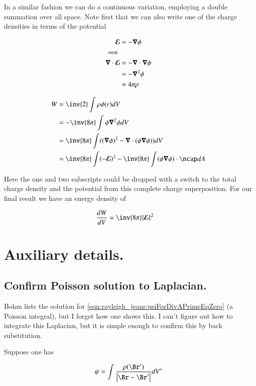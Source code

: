 In a similar fashion we can do a continuous variation, employing a double summation over all space.  Note first
that we can also write
one of the charge densities in terms of the potential 

\begin{align*}
\boldsymbol{\mathcal{E}} &= - \boldsymbol{\nabla} \phi \\
\implies \\
\boldsymbol{\nabla} \cdot \boldsymbol{\mathcal{E}} 
&= - \boldsymbol{\nabla} \cdot \boldsymbol{\nabla} \phi \\
&= - \boldsymbol{\nabla}^2 \phi \\
&= 4 \pi \rho
\end{align*}

\begin{align*}
W 
&= \inv{2} \int \rho \phi(r) dV \\
&= -\inv{8\pi} \int \phi \spacegrad^2 \phi dV \\
&= \inv{8\pi} \int ( (\spacegrad \phi)^2 - \spacegrad \cdot (\phi \spacegrad \phi)) dV \\
&= \inv{8\pi} \int (-\EE)^2 - \inv{8\pi} \int (\phi \spacegrad \phi) \cdot \ncap dA
\end{align*}

Here the one and two subscripts could be dropped with a switch to the total charge density and the potential from this complete charge superposition.
For our final result we have an energy density of

\begin{align}
\frac{dW}{dV} &= \inv{8\pi} {\EE}^2 
\end{align}

\section{Auxiliary details. }

\subsection{Confirm Poisson solution to Laplacian. }

Bohm lists the solution for \ref{eqn:rayleigh_jeans:psiForDivAPrimeEqZero} (a Poisson integral), but I forget how one shows this.  I can't figure out how to integrate this Laplacian, but it is simple enough to confirm this by back substitution.

Suppose one has

\begin{align*}
\psi = \int \frac{\rho(\Br')}{\Abs{\Br - \Br'}} dV'
\end{align*}

